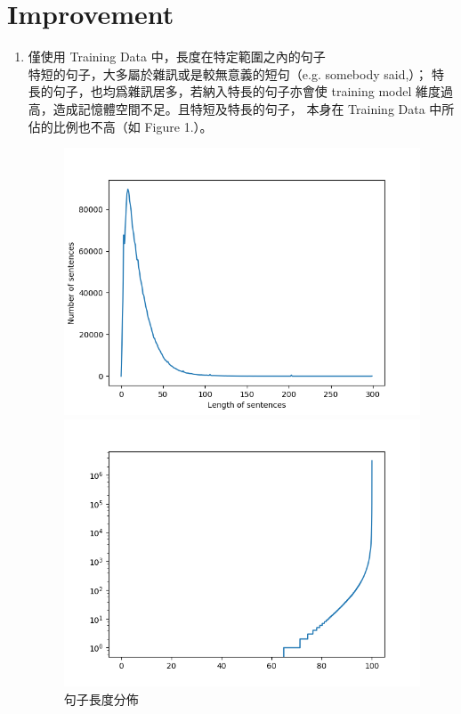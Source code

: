 \documentclass[12pt, a4paper]{article}
\theoremstyle{mystyle}	%
\begin{document}
\section{Improvement}
\begin{enumerate}
  \item 僅使用 Training Data 中，長度在特定範圍之內的句子\\
    特短的句子，大多屬於雜訊或是較無意義的短句（e.g. somebody said,）；
    特長的句子，也均爲雜訊居多，若納入特長的句子亦會使 training model
    維度過高，造成記憶體空間不足。且特短及特長的句子，
    本身在 Training Data 中所佔的比例也不高（如 Figure 1.）。
    \begin{figure}[!htb]
      \centering
       \includegraphics[scale=0.37]{sent_len_dis.png}
       \caption{句子長度分佈}
      \endminipage\hfill
        \includegraphics[scale=0.37]{word_dis2.png}

\end{figure}
\end{enumerate}
\end{document}
